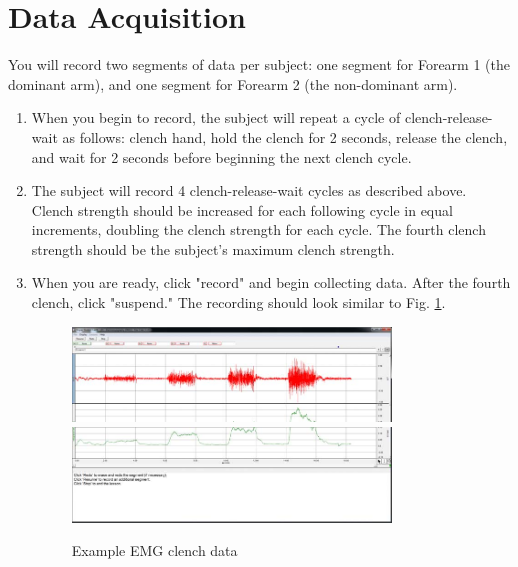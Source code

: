 \documentclass{article}
\begin{document}
\section*{Data Acquisition}
You will record two segments of data per subject: one segment for Forearm 1 (the dominant arm), and one segment for Forearm 2 (the non-dominant arm).
\begin{enumerate}
	\item When you begin to record, the subject will repeat a cycle of clench-release-wait as follows: clench hand, hold the clench for 2 seconds, release the clench, and wait for 2 seconds before beginning the next clench cycle.
	\item The subject will record 4 clench-release-wait cycles as described above. Clench strength should be increased for each following cycle in equal increments, doubling the clench strength for each cycle. The fourth clench strength should be the subject's maximum clench strength.
	\item When you are ready, click "record" and begin collecting data. After the fourth clench, click "suspend." The recording should look similar to Fig. \ref{clench}.
		\begin{figure}[h]
	\includegraphics[width=0.8\textwidth]{../images/EMG_I_9a.jpg}	\includegraphics[width=0.8\textwidth]{../images/EMG_I_9b.jpg}
		\centering
		\caption{Example EMG clench data}
		\label{clench}
		\end{figure}


\end{enumerate}
\end{document}
